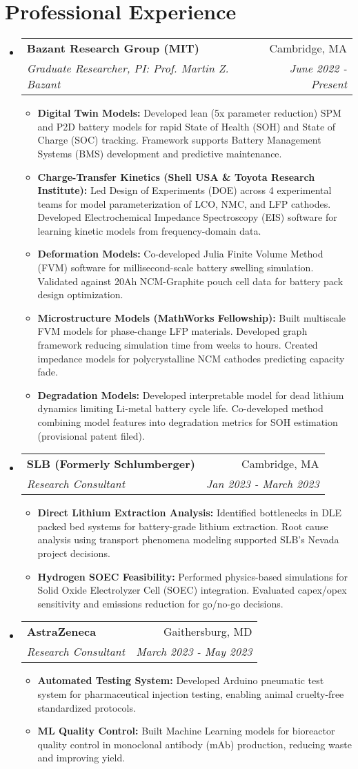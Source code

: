 \documentclass[letterpaper,11pt]{article}
\makeatletter
\newcommand{\resumeItem}[2]{
  \item\small{
    \textbf{#1}{#2 \vspace{-2pt}}
  }
}
\newcommand{\resumeSubheading}[4]{
  \vspace{-1pt}\item
    \begin{tabular*}{0.97\textwidth}{l@{\extracolsep{\fill}}r}
      \textbf{#1} & #2 \\
      \textit{\small#3} & \textit{\small #4} \\
    \end{tabular*}\vspace{-6pt}
}
\newcommand{\resumeSubHeadingListStart}{\begin{itemize}[leftmargin=*]}
\newcommand{\resumeSubHeadingListEnd}{\end{itemize}}
\newcommand{\resumeItemListStart}{\begin{itemize}}
\newcommand{\resumeItemListEnd}{\end{itemize}\vspace{-5pt}}
\makeatother
\begin{document}
\section{Professional Experience}
  \resumeSubHeadingListStart
    \resumeSubheading
      {Bazant Research Group (MIT)}{Cambridge, MA}
      {Graduate Researcher, PI: Prof. Martin Z. Bazant}{June 2022 - Present}
      \resumeItemListStart
        \resumeItem{Digital Twin Models: }{Developed lean (5x parameter reduction) SPM and P2D battery models for rapid State of Health (SOH) and State of Charge (SOC) tracking. Framework supports Battery Management Systems (BMS) development and predictive maintenance.}
        \resumeItem{Charge-Transfer Kinetics (Shell USA \& Toyota Research Institute): }{Led Design of Experiments (DOE) across 4 experimental teams for model parameterization of LCO, NMC, and LFP cathodes. Developed Electrochemical Impedance Spectroscopy (EIS) software for learning kinetic models from frequency-domain data.}
        \resumeItem{Deformation Models: }{Co-developed Julia Finite Volume Method (FVM) software for millisecond-scale battery swelling simulation. Validated against 20Ah NCM-Graphite pouch cell data for battery pack design optimization.}
        \resumeItem{Microstructure Models (MathWorks Fellowship): }{Built multiscale FVM models for phase-change LFP materials. Developed graph framework reducing simulation time from weeks to hours. Created impedance models for polycrystalline NCM cathodes predicting capacity fade.}
        \resumeItem{Degradation Models: }{Developed interpretable model for dead lithium dynamics limiting Li-metal battery cycle life. Co-developed method combining model features into degradation metrics for SOH estimation (provisional patent filed).}
      \resumeItemListEnd

    \resumeSubheading
      {SLB (Formerly Schlumberger)}{Cambridge, MA}
      {Research Consultant}{Jan 2023 - March 2023}
      \resumeItemListStart
        \resumeItem{Direct Lithium Extraction Analysis: }{Identified bottlenecks in DLE packed bed systems for battery-grade lithium extraction. Root cause analysis using transport phenomena modeling supported SLB's Nevada project decisions.}
        \resumeItem{Hydrogen SOEC Feasibility: }{Performed physics-based simulations for Solid Oxide Electrolyzer Cell (SOEC) integration. Evaluated capex/opex sensitivity and emissions reduction for go/no-go decisions.}
      \resumeItemListEnd

    \resumeSubheading
      {AstraZeneca}{Gaithersburg, MD}
      {Research Consultant}{March 2023 - May 2023}
      \resumeItemListStart
        \resumeItem{Automated Testing System: }{Developed Arduino pneumatic test system for pharmaceutical injection testing, enabling animal cruelty-free standardized protocols.}
        \resumeItem{ML Quality Control: }{Built Machine Learning models for bioreactor quality control in monoclonal antibody (mAb) production, reducing waste and improving yield.}
      \resumeItemListEnd
  \resumeSubHeadingListEnd
\end{document}

